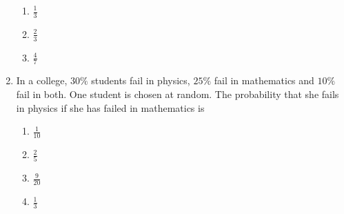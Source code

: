 \begin{enumerate}[label=\thesubsection.\arabic*,ref=\thesubsection.\theenumi]
\begin{enumerate}
\item $\frac{1}{3}$
\item $\frac{2}{3}$
\item $\frac{4}{7}$
\end{enumerate}
%
\item In a college, $30\%$ students fail in physics, $25\%$ fail in mathematics and $10\%$ fail in both. One student is chosen at random. The probability that she fails in physics if she has failed in mathematics is
\begin{enumerate}
    \item $\frac{1}{10}$
    \item $\frac{2}{5}$
    \item $\frac{9}{20}$
    \item $\frac{1}{3}$
\end{enumerate}
%
\end{enumerate}
